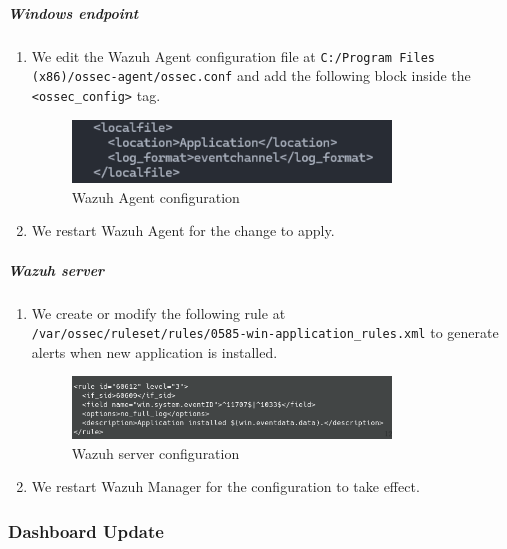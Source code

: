 \subparagraph{Windows endpoint}
\begin{enumerate}
    \item We edit the Wazuh Agent configuration file at \texttt{C:/Program Files (x86)/ossec-agent/ossec.conf} and add the following block inside the \texttt{<ossec\_config>} tag.
    \begin{figure} [H]
    \centering
    \includegraphics[width=0.8\textwidth]{images/log-data/9.png}
    \caption{Wazuh Agent configuration}
    \end{figure}
    \item We restart Wazuh Agent for the change to apply.
\end{enumerate}

\subparagraph{Wazuh server}
\begin{enumerate}
    \item We create or modify the following rule at \\ \texttt{/var/ossec/ruleset/rules/0585-win-application\_rules.xml} to generate alerts when new application is installed.
    \begin{figure} [H]
    \centering
    \includegraphics[width=0.8\textwidth]{images/log-data/10.png}
    \caption{Wazuh server configuration}
    \end{figure}
    \item We restart Wazuh Manager for the configuration to take effect.
\end{enumerate}

\subsubsection{Dashboard Update}

